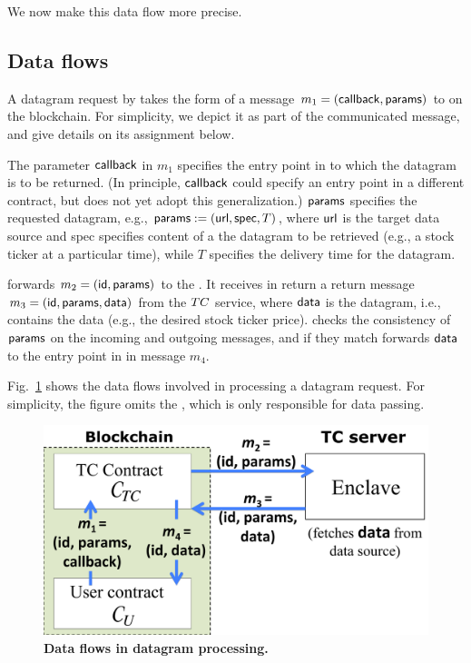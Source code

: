 We now make this data flow more precise. 

\subsection{Data flows}

A datagram request by \reqcont takes the form of a message $m_1 = ({\sf callback}, {\sf params})$ to \tcont on the blockchain. 
For simplicity, we depict it as part of the communicated message, and give details on its assignment below.

The parameter ${\sf callback}$ in $m_1$ specifies the entry point in \reqcont to which the datagram is to be returned. (In principle, ${\sf callback}$ could specify an entry point in a different contract, but \tc does not yet adopt this generalization.) ${\sf params}$ specifies the requested datagram, e.g., ${\sf params} := ({{\sf url}}, {\sf spec}, T)$, where ${{\sf url}}$ is the target data source and {\sf spec} specifies content of a the datagram to be retrieved (e.g., a stock ticker at a particular time), while $T$ specifies the delivery time for the datagram. 

\tcont forwards $m_2 = ({\sf id}, {\sf params})$ to the \encname. It receives in return a return message $m_3 = ({\sf id}, {\sf params}, {\sf data})$ from the $TC$ service, where ${\sf data}$ is the datagram, i.e., contains the data (e.g., the desired stock ticker price). \tcont checks the consistency of ${\sf params}$ on the incoming and outgoing messages, and if they match forwards ${\sf data}$ to the entry point \dgcallback in \reqcont in message $m_4$. 

Fig.~\ref{fig:dataflow} shows the data flows involved in processing a datagram request. For simplicity, the figure omits the \medname, which is only responsible for data passing.


\begin{figure}[h!]
\centering
\includegraphics[width=\columnwidth]{figures/DataflowFig}
\caption{{\bf Data flows in datagram processing.}  }
\label{fig:dataflow}
\end{figure}


